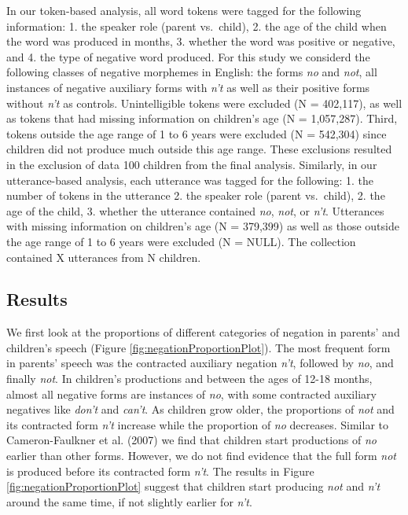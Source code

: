 \documentclass[man,floatsintext,draftall]{apa6}
\begin{document}
In our token-based analysis, all word tokens were tagged for the following information: 1. the speaker role (parent vs.~child), 2. the age of the child when the word was produced in months, 3. whether the word was positive or negative, and 4. the type of negative word produced. For this study we considerd the following classes of negative morphemes in English: the forms \emph{no} and \emph{not}, all instances of negative auxiliary forms with \emph{n't} as well as their positive forms without \emph{n't} as controls. Unintelligible tokens were excluded (N = 402,117), as well as tokens that had missing information on children's age (N = 1,057,287). Third, tokens outside the age range of 1 to 6 years were excluded (N = 542,304) since children did not produce much outside this age range. These exclusions resulted in the exclusion of data 100 children from the final analysis. Similarly, in our utterance-based analysis, each utterance was tagged for the following: 1. the number of tokens in the utterance 2. the speaker role (parent vs.~child), 2. the age of the child, 3. whether the utterance contained \emph{no}, \emph{not}, or \emph{n't}. Utterances with missing information on children's age (N = 379,399) as well as those outside the age range of 1 to 6 years were excluded (N = NULL). The collection contained X utterances from N children.

\hypertarget{results}{%
\subsection{Results}\label{results}}

We first look at the proportions of different categories of negation in parents' and children's speech (Figure \ref{fig:negationProportionPlot}). The most frequent form in parents' speech was the contracted auxiliary negation \emph{n't}, followed by \emph{no}, and finally \emph{not}. In children's productions and between the ages of 12-18 months, almost all negative forms are instances of \emph{no}, with some contracted auxiliary negatives like \emph{don't} and \emph{can't}. As children grow older, the proportions of \emph{not} and its contracted form \emph{n't} increase while the proportion of \emph{no} decreases. Similar to Cameron-Faulkner et al. (2007) we find that children start productions of \emph{no} earlier than other forms. However, we do not find evidence that the full form \emph{not} is produced before its contracted form \emph{n't}. The results in Figure \ref{fig:negationProportionPlot} suggest that children start producing \emph{not} and \emph{n't} around the same time, if not slightly earlier for \emph{n't}.
\end{document}
